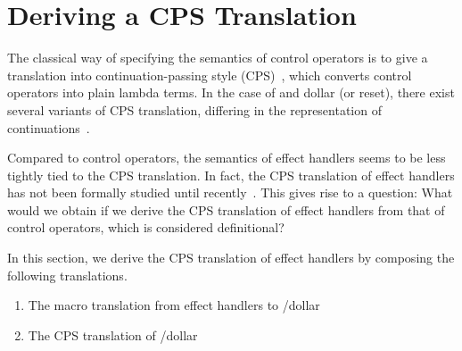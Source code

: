 \newcommand{\SMacro}{
\begin{figure}[t]

\begin{align*}
\macro{\doop{V}} &=
  \shiftz{k}
         {(\abs{h}
               {\apptwo{h}{\macro{V}}{(\abs{x}{\apptwo{k}{x}{h}})}})} \\
\macro{\handle{M}{x}{M_r}{x}{k}{M_h}} &=
  \app{\dollarret{\macro{M}}{x}{\abs{h}{\macro{M_r}}}}
      {(\abstwo{x}{k}{\macro{M_h}})}
\end{align*}

\caption{Simpler Macro Translation from \lambdah to \lambdasz~\cite{forster-jfp}}
\label{fig:smacro}
\end{figure}
}

\section{Deriving a CPS Translation}
\label{sec:cps}

The classical way of specifying the semantics of control operators is to
give a translation into continuation-passing style (CPS)~\cite{plotkin-cps},
which converts control operators into plain lambda terms.
In the case of \shiftztt and dollar (or reset), there exist several variants
of CPS translation, differing in the representation of
continuations~\cite{biernacki-toplas,dyvbig-monadic,shan-simulation,materzok-subtyping,materzok-hierarchy}.

Compared to control operators, the semantics of effect handlers seems to
be less tightly tied to the CPS translation.
In fact, the CPS translation of effect handlers has not been formally
studied until recently~\cite{hillerstrom-cps,hillerstrom-jfp}.
This gives rise to a question: What would we obtain if we derive the CPS
translation of effect handlers from that of control operators, which is
considered definitional?

In this section, we derive the CPS translation of effect handlers by
composing the following translations.

\begin{enumerate}
\item The macro translation from effect handlers to
  \shiftztt/dollar~\cite{forster-jfp}
\item The CPS translation of \shiftztt/dollar~\cite{materzok-hierarchy}
\end{enumerate}

